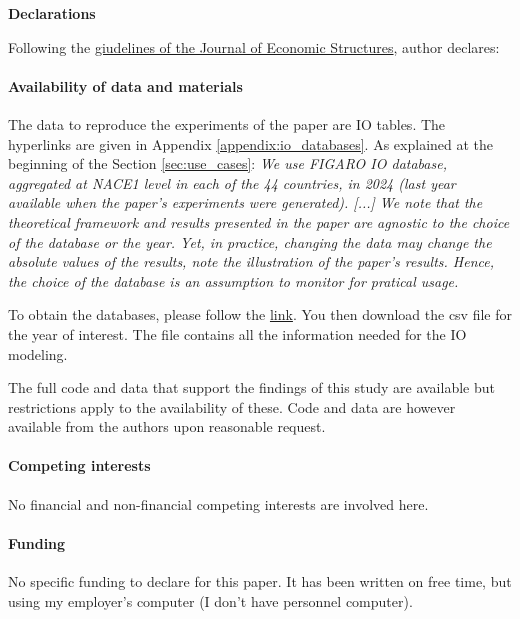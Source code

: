 \documentclass{article}
\begin{document}
\newpage

\noindent \textbf{Declarations}

\vspace{0.1cm}

\noindent Following the \href{https://link.springer.com/journal/40008/submission-guidelines/research-article}{giudelines of the Journal of Economic Structures}, author declares:

\paragraph{Availability of data and materials} The data to reproduce the experiments of the paper are IO tables. The hyperlinks are given in Appendix \ref{appendix:io_databases}. As explained at the beginning of the Section \ref{sec:use_cases}: \textit{We use FIGARO IO database, aggregated at NACE1 level in each of the 44 countries, in 2024 (last year available when the paper's experiments were generated). [...] We note that the theoretical framework and results presented in the paper are agnostic to the choice of the database or the year. Yet, in practice, changing the data may change the absolute values of the results, note the illustration of the paper's results. Hence, the choice of the database is an assumption to monitor for pratical usage. }

\vspace{0.1cm}

To obtain the databases, please follow the \href{https://circabc.europa.eu/ui/group/cec66924-a924-4f91-a0ef-600a0531e3ba/library/e6896a70-5dbf-479c-8852-94b5dd1e3952?p=1&n=10&sort=modified_DESC}{link}. You then download the csv file for the year of interest. The file contains all the information needed for the IO modeling. 

\vspace{0.1cm}

The full code and data that support the findings of this study are available but restrictions apply to the availability of these. Code and data are however available from the authors upon reasonable request.
 

\paragraph{Competing interests} No financial and non-financial competing interests are involved here.

\paragraph{Funding} No specific funding to declare for this paper. It has been written on free time, but using my employer's computer (I don't have personnel computer). 
\end{document}
